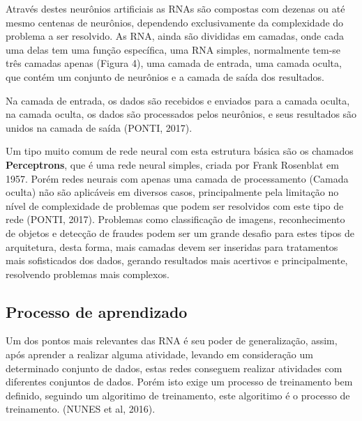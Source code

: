 Através destes neurônios artificiais as RNAs são compostas com dezenas ou até mesmo centenas de neurônios, dependendo exclusivamente da complexidade do problema a ser resolvido. As RNA, ainda são divididas em camadas, onde cada uma delas tem uma função específica, uma RNA simples, normalmente tem-se três camadas apenas (Figura 4), uma camada de entrada, uma camada oculta, que contém um conjunto de neurônios e a camada de saída dos resultados.


Na camada de entrada, os dados são recebidos e enviados para a camada oculta, na camada oculta, os dados são processados pelos neurônios, e seus resultados são unidos na camada de saída (PONTI, 2017).

Um tipo muito comum de rede neural com esta estrutura básica são os chamados \textbf{Perceptrons}, que é uma rede neural simples, criada por Frank Rosenblat em 1957. Porém redes neurais com apenas uma camada de processamento (Camada oculta) não são aplicáveis em diversos casos, principalmente pela limitação no nível de complexidade de problemas que podem ser resolvidos com este tipo de rede (PONTI, 2017). Problemas como classificação de imagens, reconhecimento de objetos e detecção de fraudes podem ser um grande desafio para estes tipos de arquitetura, desta forma, mais camadas devem ser inseridas para tratamentos mais sofisticados dos dados, gerando resultados mais acertivos e principalmente, resolvendo problemas mais complexos. 

\subsection{Processo de aprendizado}

Um dos pontos mais relevantes das RNA é seu poder de generalização, assim, após aprender a realizar alguma atividade, levando em consideração um determinado conjunto de dados, estas redes conseguem realizar atividades com diferentes conjuntos de dados. Porém isto exige um processo de treinamento bem definido, seguindo um algoritimo de treinamento, este algoritimo é o processo de treinamento. (NUNES et al, 2016).

